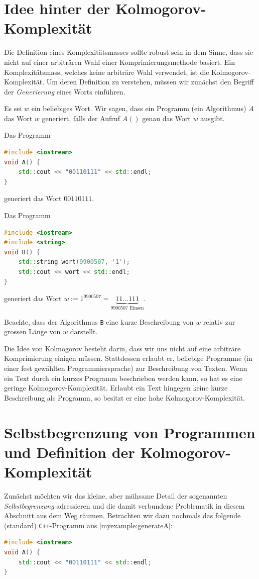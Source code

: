 \section{Idee hinter der Kolmogorov-Komplexität}
Die Definition eines Komplexitätsmasses sollte robust sein in dem Sinne, dass sie nicht auf einer arbiträren Wahl einer Komprimierungsmethode basiert. Ein Komplexitätsmass, welches keine arbiträre Wahl verwendet, ist die Kolmogorov-Komplexität. Um deren Definition zu verstehen, müssen wir zunächst den Begriff der \textit{Generierung} eines Worts einführen.

\begin{mydefinition}\label{mydefinition:erzeugung}
Es sei $w$ ein beliebiges Wort. Wir sagen, dass ein Programm (ein Algorithmus) $A$ das Wort $w$ generiert, falls der Aufruf $A()$ genau das Wort $w$ ausgibt.
\end{mydefinition}

\begin{myexample}\label{myexample:generateA}
Das Programm
\begin{lstlisting}[language=C++]
#include <iostream>
void A() {
    std::cout << "00110111" << std::endl;
}
\end{lstlisting}
generiert das Wort $00110111$.
\end{myexample}

\begin{myexample}
Das Programm
\begin{lstlisting}[language=C++]
#include <iostream>
#include <string>
void B() {
    std::string wort(9900507, '1');
    std::cout << wort << std::endl;
}
\end{lstlisting}
generiert das Wort $w := 1^{9900507} = \underbrace{11\ldots 111}_{\text{9900507 Einsen}}$.
\par
Beachte, dass der Algorithmus \texttt{B} eine kurze Beschreibung von $w$ relativ zur grossen Länge von $w$ darstellt.
\end{myexample}

Die Idee von Kolmogorov besteht darin, dass wir uns nicht auf eine arbiträre Komprimierung einigen müssen. Stattdessen erlaubt er, beliebige Programme (in einer fest gewählten Programmiersprache) zur Beschreibung von Texten. Wenn ein Text durch ein kurzes Programm beschrieben werden kann, so hat es eine geringe Kolmogorov-Komplexität. Erlaubt ein Text hingegen keine kurze Beschreibung als Programm, so besitzt er eine hohe Kolmogorov-Komplexität.

\section{Selbstbegrenzung von Programmen und Definition der Kolmogorov-Komplexität}
Zunächst möchten wir das kleine, aber mühsame Detail der sogenannten \textit{Selbstbegrenzung} adressieren und die damit verbundene Problematik in diesem Abschnitt aus dem Weg räumen. Betrachten wir dazu nochmals das folgende (standard) \texttt{C++}-Programm aus \cref{myexample:generateA}:
\begin{lstlisting}[language=C++,escapechar=!] 
#include <iostream>
void A() {
    std::cout << "00110111" << std::endl;
}
\end{lstlisting}

